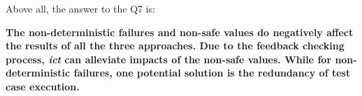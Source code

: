 \documentclass[10pt,journal,compsoc]{IEEEtran}
\begin{document}

Above all, the answer to the Q7 is:

\textbf{The non-deterministic failures and non-safe values do negatively affect the results of all the three approaches.  Due to the feedback checking process, \emph{ict} can alleviate impacts of the non-safe values. While for non-deterministic failures, one potential solution is the redundancy of test case execution.}
\end{document}
